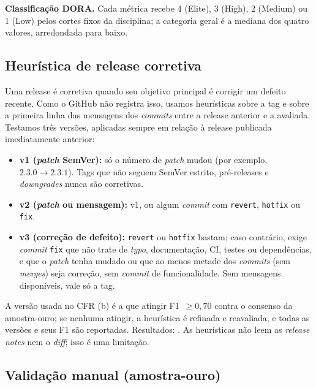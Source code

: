 \textbf{Classificação DORA.} Cada métrica recebe 4 (Elite), 3 (High), 2 (Medium)
ou 1 (Low) pelos cortes fixos da disciplina; a categoria geral é a mediana dos
quatro valores, arredondada para baixo.

\subsection{Heurística de release corretiva}
\label{sec:heuristica}

Uma release é corretiva quando seu objetivo principal é corrigir um defeito
recente. Como o GitHub não registra isso, usamos heurísticas sobre a tag e sobre
a primeira linha das mensagens dos \textit{commits} entre a release anterior e a
avaliada. Testamos três versões, aplicadas sempre em relação à release publicada
imediatamente anterior:

\begin{itemize}
  \item \textbf{v1 (\textit{patch} SemVer):} só o número de \textit{patch}
  mudou (por exemplo, $2.3.0 \rightarrow 2.3.1$). Tags que não seguem SemVer
  estrito, pré-releases e \textit{downgrades} nunca são corretivas.
  \item \textbf{v2 (\textit{patch} ou mensagem):} v1, ou algum \textit{commit}
  com \texttt{revert}, \texttt{hotfix} ou \texttt{fix}.
  \item \textbf{v3 (correção de defeito):} \texttt{revert} ou \texttt{hotfix}
  bastam; caso contrário, exige \textit{commit} \texttt{fix} que não trate de
  \textit{typo}, documentação, CI, testes ou dependências, e que o \textit{patch}
  tenha mudado ou que ao menos metade dos \textit{commits} (sem \textit{merges}) seja
  correção, sem \textit{commit} de funcionalidade. Sem mensagens disponíveis,
  vale só a tag.
\end{itemize}

A versão usada no CFR (b) é a que atingir F1~$\geq 0{,}70$ contra o consenso
da amostra-ouro; se nenhuma atingir, a heurística é refinada e reavaliada, e
todas as versões e seus F1 são reportadas. Resultados:
.
As heurísticas não leem as \textit{release notes} nem o \textit{diff}; isso é
uma limitação.

\subsection{Validação manual (amostra-ouro)}
\label{sec:validacao}

